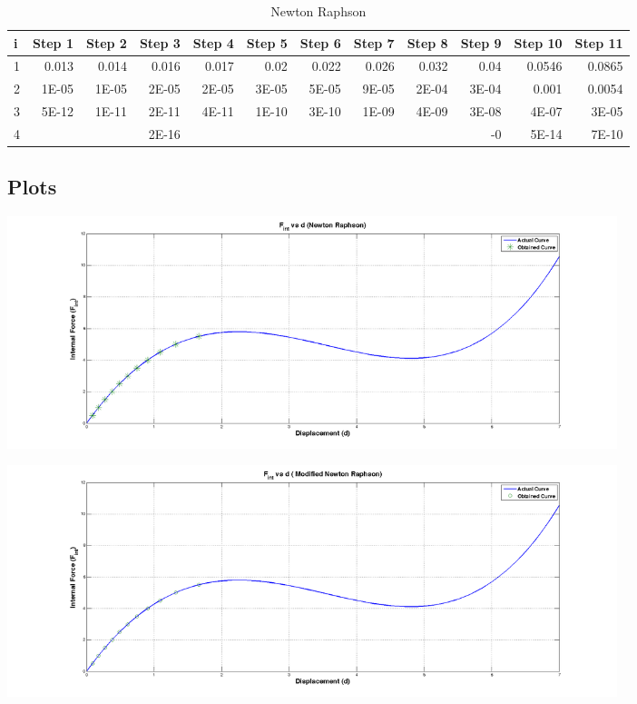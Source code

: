 \documentclass[11pt]{article}
\begin{document}
\begin{table}[htbp]
  \centering
  \caption{Newton Raphson}
    \begin{tabular}{rrrrrrrrrrrr}
    \toprule
    \multicolumn{1}{l}{\textbf{i}} & \multicolumn{1}{l}{\textbf{Step 1}} & \multicolumn{1}{l}{\textbf{Step 2}} & \multicolumn{1}{l}{\textbf{Step 3}} & \multicolumn{1}{l}{\textbf{Step 4}} & \multicolumn{1}{l}{\textbf{Step 5}} & \multicolumn{1}{l}{\textbf{Step 6}} & \multicolumn{1}{l}{\textbf{Step 7}} & \multicolumn{1}{l}{\textbf{Step 8}} & \multicolumn{1}{l}{\textbf{Step 9}} & \multicolumn{1}{l}{\textbf{Step 10}} & \multicolumn{1}{l}{\textbf{Step 11}} \\
    \midrule
    1     & 0.013 & 0.014 & 0.016 & 0.017 & 0.02  & 0.022 & 0.026 & 0.032 & 0.04  & 0.0546 & 0.0865 \\
    2     & 1E-05 & 1E-05 & 2E-05 & 2E-05 & 3E-05 & 5E-05 & 9E-05 & 2E-04 & 3E-04 & 0.001 & 0.0054 \\
    3     & 5E-12 & 1E-11 & 2E-11 & 4E-11 & 1E-10 & 3E-10 & 1E-09 & 4E-09 & 3E-08 & 4E-07 & 3E-05 \\
    4     &       &       & 2E-16 &       &       &       &       &       & -0    & 5E-14 & 7E-10 \\
    \bottomrule
    \end{tabular}%
  \label{tab:addlabel}%
\end{table}%
\subsection*{Plots}
\begin{center}
\includegraphics[width=7in]{HW13NR} \nonumber
\end{center}
\begin{center}
\includegraphics[width=7in]{HW13MNR} \nonumber
\end{center}
\newpage
\end{document}
